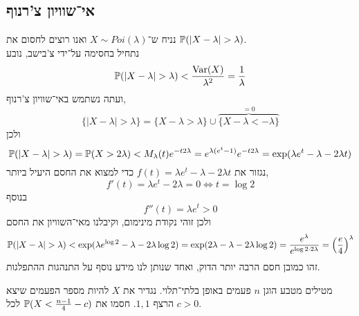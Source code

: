 \subsection{אי־שוויון צ'רנוף}
\begin{example}
	נניח ש־$X \sim Poi(\lambda)$ ואנו רוצים לחסום את $\mathbb{P}(|X - \lambda| > \lambda)$. \\
	נתחיל בחסימה על־ידי צ'בישב, נובע
	\[
		\mathbb{P}(|X - \lambda| > \lambda)
		< \frac{\operatorname{Var}(X)}{\lambda^2}
		= \frac{1}{\lambda}
	\]
	ועתה נשתמש באי־שוויון צ'רנוף,
	\[
		\{ |X - \lambda| > \lambda \}
		= \{ X - \lambda > \lambda \} \cup \overbrace{\{X - \lambda < - \lambda \}}^{= 0}
	\]
	ולכן
	\[
		\mathbb{P}(|X - \lambda| > \lambda)
		= \mathbb{P}(X > 2 \lambda)
		< M_\lambda(t) e^{-t 2\lambda}
		= e^{\lambda(e^t - 1)} e^{-t2\lambda}
		= \exp(\lambda e^t - \lambda - 2 \lambda t)
	\]
	נגזור את $f(t) = \lambda e^t - \lambda - 2 \lambda t$ כדי למצוא את החסם היעיל ביותר,
	\[
		f'(t)
		= \lambda e^t - 2 \lambda
		= 0
		\iff
		t = \log 2
	\]
	בנוסף
	\[
		f''(t) = \lambda e^t > 0
	\]
	ולכן זוהי נקודת מינימום, וקיבלנו מאי־השוויון את החסם
	\[
		\mathbb{P}(|X - \lambda| > \lambda)
		< \exp(\lambda e^{\log 2} - \lambda - 2 \lambda \log 2)
		= \exp (2\lambda - \lambda - 2 \lambda \log 2)
		= \frac{e^\lambda}{e^{\log 2 \cdot 2 \lambda}}
		= {\left(\frac{e}{4}\right)}^\lambda
	\]
	זהו כמובן חסם הרבה יותר הדוק, ואחד שנותן לנו מידע נוסף על התנהגות ההתפלגות.
\end{example}
\begin{exercise}
	מטילים מטבע הוגן $n$ פעמים באופן בלתי־תלוי.
	נגדיר את $X$ להיות מספר הפעמים שיצא הרצף $1, 1$.
	חסמו את $\mathbb{P}(X < \frac{n - 1}{4} - c)$ לכל $c > 0$.
\end{exercise}
